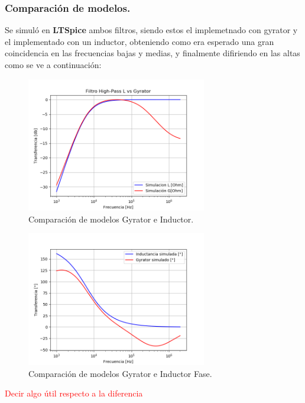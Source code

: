 \documentclass[a4paper]{article}
\begin{document}
\subsubsection{Comparación de modelos.}
Se simuló en \textbf{LTSpice} ambos filtros, siendo estos el implemetnado con gyrator y el implementado con un inductor, obteniendo como era esperado una gran coincidencia en las frecuencias bajas y medias, y finalmente difiriendo en las altas como se ve a continuación:
\begin{figure}[H]	
	\centering
	\includegraphics[width=0.7\textwidth]{ImagenesEj2/simHP.PNG}
	\caption{Comparación de modelos Gyrator e Inductor.}
	\label{fig:gyrInd}
\end{figure}
\begin{figure}[H]	
	\centering
	\includegraphics[width=0.7\textwidth]{ImagenesEj2/simHPP.PNG}
	\caption{Comparación de modelos Gyrator e Inductor Fase.}
	\label{fig:gyrIndP}
\end{figure}

\begin{center} \textcolor{red}{Decir algo útil respecto a la diferencia}\end{center}
\end{document}
